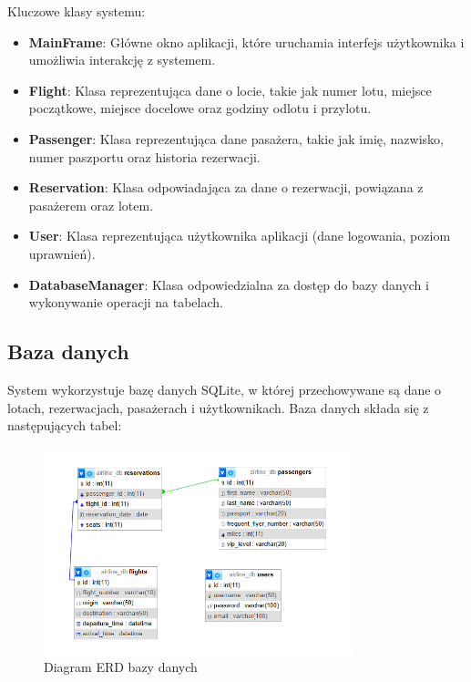 Kluczowe klasy systemu:
\begin{itemize}
    \item \textbf{MainFrame}: Główne okno aplikacji, które uruchamia interfejs użytkownika i umożliwia interakcję z systemem.
    \item \textbf{Flight}: Klasa reprezentująca dane o locie, takie jak numer lotu, miejsce początkowe, miejsce docelowe oraz godziny odlotu i przylotu.
    \item \textbf{Passenger}: Klasa reprezentująca dane pasażera, takie jak imię, nazwisko, numer paszportu oraz historia rezerwacji.
    \item \textbf{Reservation}: Klasa odpowiadająca za dane o rezerwacji, powiązana z pasażerem oraz lotem.
    \item \textbf{User}: Klasa reprezentująca użytkownika aplikacji (dane logowania, poziom uprawnień).
    \item \textbf{DatabaseManager}: Klasa odpowiedzialna za dostęp do bazy danych i wykonywanie operacji na tabelach.
\end{itemize}

\subsection{Baza danych}
System wykorzystuje bazę danych SQLite, w której przechowywane są dane o lotach, rezerwacjach, pasażerach i użytkownikach. Baza danych składa się z następujących tabel:



\begin{figure}[H]
\centering
\includegraphics[width=0.8\textwidth]{figures/ERD_diagram.png}
\caption{Diagram ERD bazy danych}
\label{fig:erd_diagram}
\end{figure}
